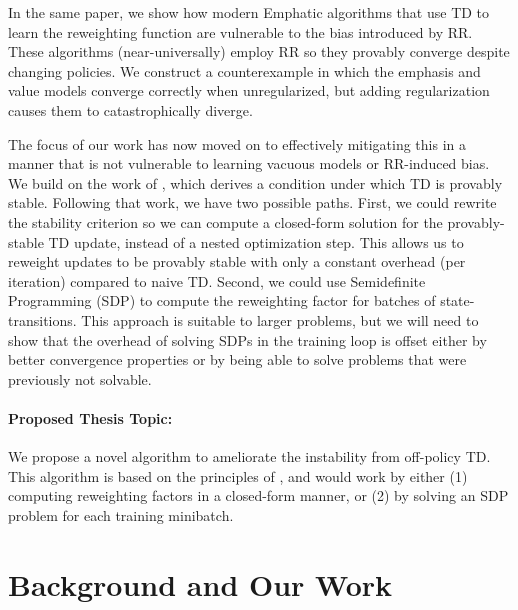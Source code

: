 \documentclass[11pt]{article}
\begin{document}
In the same paper, we show how modern Emphatic algorithms that use TD to learn the reweighting function are vulnerable to the bias introduced by RR. These algorithms (near-universally) employ RR so they provably converge despite changing policies. We construct a counterexample in which the emphasis and value models converge correctly when unregularized, but adding regularization causes them to catastrophically diverge.


The focus of our work has now moved on to effectively mitigating this in a manner that is not vulnerable to learning vacuous models or RR-induced bias. We build on the work of \citet{kolter2011fixed}, which derives a condition under which TD is provably stable. Following that work, we have two possible paths. First, we could rewrite the stability criterion so we can compute a closed-form solution for the provably-stable TD update, instead of a nested optimization step. This allows us to reweight updates to be provably stable with only a constant overhead (per iteration) compared to naive TD. Second, we could use Semidefinite Programming (SDP) to compute the reweighting factor for batches of state-transitions. This approach is suitable to larger problems, but we will need to show that the overhead of solving SDPs in the training loop is offset either by better convergence properties or by being able to solve problems that were previously not solvable.

\paragraph{Proposed Thesis Topic:} We propose a novel algorithm to ameliorate the instability from off-policy TD. This algorithm is based on the principles of \cite{kolter2011fixed}, and would work by either (1) computing reweighting factors in a closed-form manner, or (2) by solving an SDP problem for each training minibatch.

\section{Background and Our Work}
\end{document}
